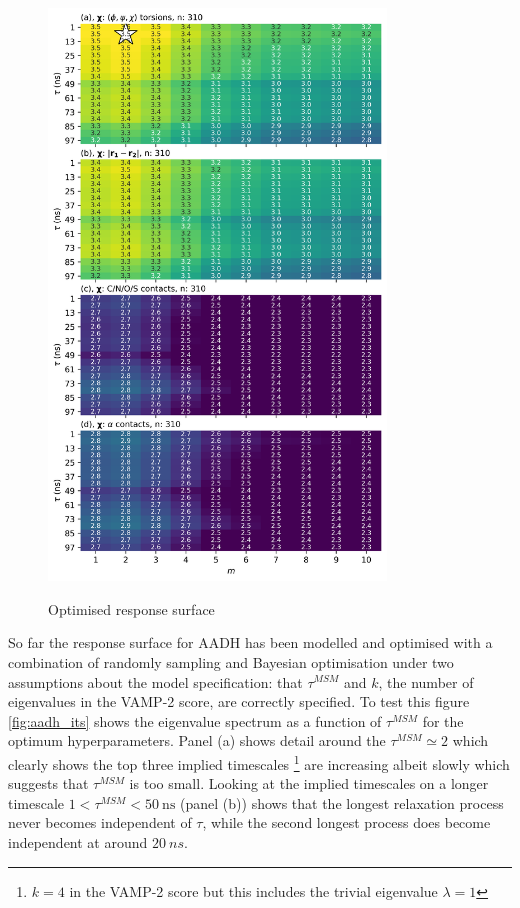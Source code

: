 \begin{figure}[ht!]
    \centering
    \caption{Optimised response surface}
    \includegraphics[width=0.8\textwidth]{chapters/msm_optimization/figures/aadh_response_surface_d_opt.png.png}
    \label{fig:aadh_rsm_opt}
\end{figure}



So far the response surface for AADH has been modelled and optimised with a combination of randomly sampling and Bayesian optimisation under two assumptions about the model specification: that $\tau^{MSM}$ and $k$, the number of eigenvalues in the VAMP-2 score, are correctly specified. To test this figure \ref{fig:aadh_its} shows the eigenvalue spectrum as a function of $\tau^{MSM}$ for the optimum hyperparameters. Panel (a) shows detail around the  $\tau^{MSM} \simeq 2$ which clearly shows the top three implied timescales \footnote{$k=4$ in the VAMP-2 score but this includes the trivial eigenvalue $\lambda = 1$} are increasing albeit slowly which suggests that $\tau^{MSM}$ is too small. Looking at the implied timescales on a longer timescale $1 < \tau^{MSM} < \SI{50}{\nano\second}$ (panel (b)) shows that the longest relaxation process never becomes independent of $\tau$, while the second longest process does become independent at around $\SI{20}{ns}$. 

